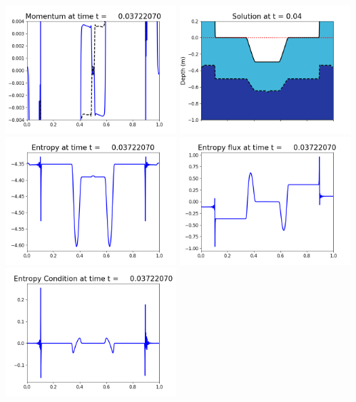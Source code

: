 \documentclass[11pt]{article}
\begin{document}
\vskip 10pt 
\includegraphics[width=0.475\textwidth]{frame0086fig1003.png}
\includegraphics[width=0.475\textwidth]{frame0086fig1006.png}
\vskip 10pt 
\includegraphics[width=0.475\textwidth]{frame0086fig1007.png}
\includegraphics[width=0.475\textwidth]{frame0086fig1008.png}
\vskip 10pt 
\includegraphics[width=0.475\textwidth]{frame0086fig1009.png}
\end{document}
